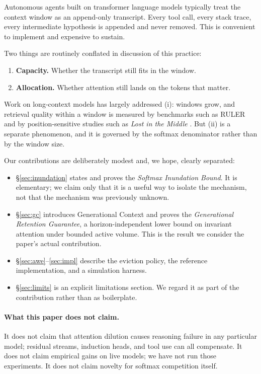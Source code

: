 ﻿\documentclass[11pt,a4paper]{article}
\theoremstyle{plain}
\theoremstyle{definition}
\theoremstyle{remark}
\begin{document}
Autonomous agents built on transformer language models typically treat the
context window as an append-only transcript. Every tool call, every stack trace,
every intermediate hypothesis is appended and never removed. This is convenient
to implement and expensive to sustain.

Two things are routinely conflated in discussion of this practice:

\begin{enumerate}[label=(\roman*)]
  \item \textbf{Capacity.} Whether the transcript still fits in the window.
  \item \textbf{Allocation.} Whether attention still lands on the tokens that
        matter.
\end{enumerate}

Work on long-context models has largely addressed (i): windows grow, and
retrieval quality within a window is measured by benchmarks such as RULER
\cite{hsieh2024ruler} and by position-sensitive studies such as
\emph{Lost in the Middle} \cite{liu2023lost}. But (ii) is a separate phenomenon,
and it is governed by the softmax denominator rather than by the window size.

Our contributions are deliberately modest and, we hope, clearly separated:

\begin{itemize}
  \item \S\ref{sec:inundation} states and proves the \emph{Softmax Inundation
        Bound}. It is elementary; we claim only that it is a useful way to
        isolate the mechanism, not that the mechanism was previously unknown.
  \item \S\ref{sec:gc} introduces Generational Context and proves the
        \emph{Generational Retention Guarantee}, a horizon-independent lower
        bound on invariant attention under bounded active volume. This is the
        result we consider the paper's actual contribution.
  \item \S\ref{sec:awe}--\ref{sec:impl} describe the eviction policy, the
        reference implementation, and a simulation harness.
  \item \S\ref{sec:limits} is an explicit limitations section. We regard it as
        part of the contribution rather than as boilerplate.
\end{itemize}

\paragraph{What this paper does not claim.}
It does not claim that attention dilution causes reasoning failure in any
particular model; residual streams, induction heads, and tool use can all
compensate. It does not claim empirical gains on live models; we have not run
those experiments. It does not claim novelty for softmax competition itself.
\end{document}
